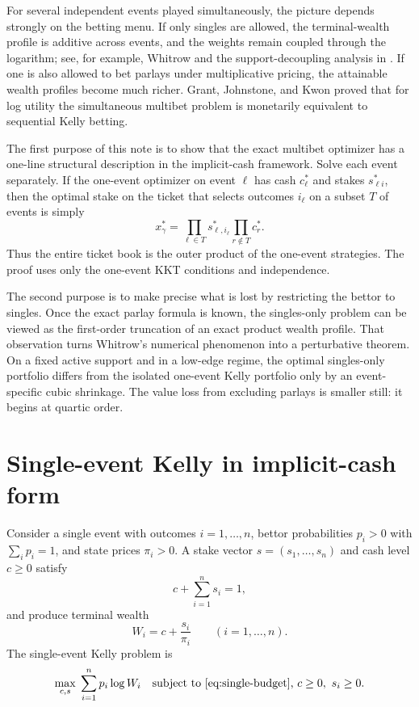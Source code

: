 \documentclass[11pt]{article}
\numberwithin{equation}{section}
\theoremstyle{remark}
\theoremstyle{definition}
\newcommand{\1}{\mathbf{1}}
\begin{document}
For several independent events played simultaneously, the picture depends strongly on the betting menu. If only singles are allowed, the terminal-wealth profile is additive across events, and the weights remain coupled through the logarithm; see, for example, Whitrow \cite{Whitrow2007} and the support-decoupling analysis in \cite{LongUtility2026}. If one is also allowed to bet parlays under multiplicative pricing, the attainable wealth profiles become much richer. Grant, Johnstone, and Kwon \cite{GrantJohnstoneKwon2008} proved that for log utility the simultaneous multibet problem is monetarily equivalent to sequential Kelly betting.

The first purpose of this note is to show that the exact multibet optimizer has a one-line structural description in the implicit-cash framework. Solve each event separately. If the one-event optimizer on event $\ell$ has cash $c_\ell^*$ and stakes $s_{\ell i}^*$, then the optimal stake on the ticket that selects outcomes $i_\ell$ on a subset $T$ of events is simply
\[
  x_{\gamma}^* = \prod_{\ell\in T} s_{\ell,i_\ell}^* \prod_{r\notin T} c_r^*.
\]
Thus the entire ticket book is the outer product of the one-event strategies. The proof uses only the one-event KKT conditions and independence.

The second purpose is to make precise what is lost by restricting the bettor to singles. Once the exact parlay formula is known, the singles-only problem can be viewed as the first-order truncation of an exact product wealth profile. That observation turns Whitrow's numerical phenomenon into a perturbative theorem. On a fixed active support and in a low-edge regime, the optimal singles-only portfolio differs from the isolated one-event Kelly portfolio only by an event-specific cubic shrinkage. The value loss from excluding parlays is smaller still: it begins at quartic order.

\section{Single-event Kelly in implicit-cash form}
Consider a single event with outcomes $i=1,\dots,n$, bettor probabilities $p_i>0$ with $\sum_i p_i=1$, and state prices $\pi_i>0$. A stake vector $s=(s_1,\dots,s_n)$ and cash level $c\ge 0$ satisfy
\begin{equation}
  c+\sum_{i=1}^n s_i = 1,
  \label{eq:single-budget}
\end{equation}
and produce terminal wealth
\begin{equation}
  W_i = c + \frac{s_i}{\pi_i}
  \qquad (i=1,\dots,n).
  \label{eq:single-wealth}
\end{equation}
The single-event Kelly problem is
\begin{equation}
  \max_{c,s}\; \sum_{i=1}^n p_i \log W_i
  \quad \text{subject to \eqref{eq:single-budget}, } c\ge 0,\ s_i\ge 0.
  \label{eq:single-kelly}
\end{equation}
\end{document}
